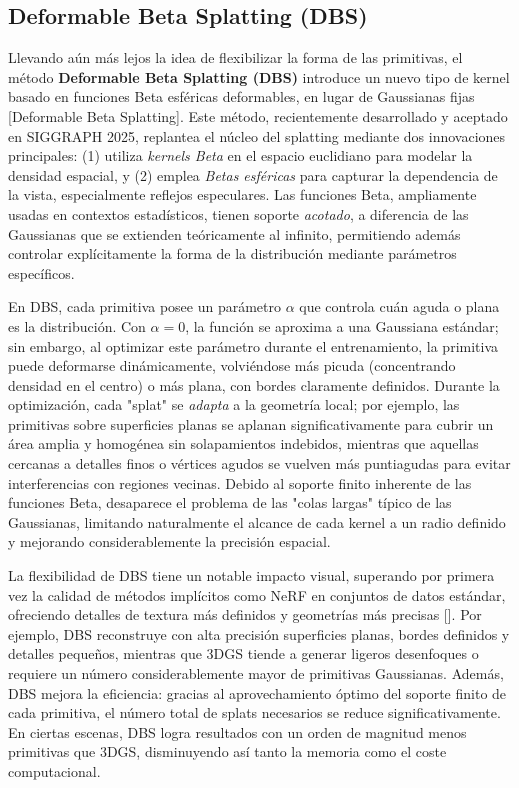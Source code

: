 \subsection{Deformable Beta Splatting (DBS)}

Llevando aún más lejos la idea de flexibilizar la forma de las primitivas, el método \textbf{Deformable Beta Splatting (DBS)} introduce un nuevo tipo de kernel basado en funciones Beta esféricas deformables, en lugar de Gaussianas fijas [Deformable Beta Splatting]. Este método, recientemente desarrollado y aceptado en SIGGRAPH 2025, replantea el núcleo del splatting mediante dos innovaciones principales: (1) utiliza \textit{kernels Beta} en el espacio euclidiano para modelar la densidad espacial, y (2) emplea \textit{Betas esféricas} para capturar la dependencia de la vista, especialmente reflejos especulares. Las funciones Beta, ampliamente usadas en contextos estadísticos, tienen soporte \textit{acotado}, a diferencia de las Gaussianas que se extienden teóricamente al infinito, permitiendo además controlar explícitamente la forma de la distribución mediante parámetros específicos. 

En DBS, cada primitiva posee un parámetro $\alpha$ que controla cuán aguda o plana es la distribución. Con $\alpha=0$, la función se aproxima a una Gaussiana estándar; sin embargo, al optimizar este parámetro durante el entrenamiento, la primitiva puede deformarse dinámicamente, volviéndose más picuda (concentrando densidad en el centro) o más plana, con bordes claramente definidos. Durante la optimización, cada "splat" se \textit{adapta} a la geometría local; por ejemplo, las primitivas sobre superficies planas se aplanan significativamente para cubrir un área amplia y homogénea sin solapamientos indebidos, mientras que aquellas cercanas a detalles finos o vértices agudos se vuelven más puntiagudas para evitar interferencias con regiones vecinas. Debido al soporte finito inherente de las funciones Beta, desaparece el problema de las "colas largas" típico de las Gaussianas, limitando naturalmente el alcance de cada kernel a un radio definido y mejorando considerablemente la precisión espacial.

La flexibilidad de DBS tiene un notable impacto visual, superando por primera vez la calidad de métodos implícitos como NeRF en conjuntos de datos estándar, ofreciendo detalles de textura más definidos y geometrías más precisas [\cite{liu2025deformablebetasplatting}]. Por ejemplo, DBS reconstruye con alta precisión superficies planas, bordes definidos y detalles pequeños, mientras que 3DGS tiende a generar ligeros desenfoques o requiere un número considerablemente mayor de primitivas Gaussianas. Además, DBS mejora la eficiencia: gracias al aprovechamiento óptimo del soporte finito de cada primitiva, el número total de splats necesarios se reduce significativamente. En ciertas escenas, DBS logra resultados con un orden de magnitud menos primitivas que 3DGS, disminuyendo así tanto la memoria como el coste computacional.

